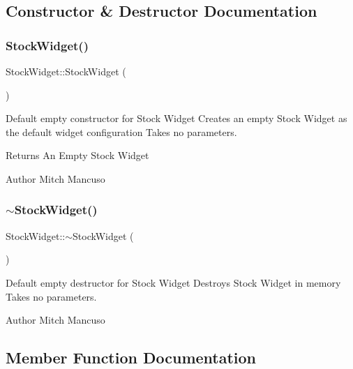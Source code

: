 \subsection{Constructor \& Destructor Documentation}
\mbox{\label{class_stock_widget_aa2748d2e00f0e4b91e1aea0faccba2f1}} 
\subsubsection{\texorpdfstring{Stock\+Widget()}{StockWidget()}}
{\footnotesize\ttfamily Stock\+Widget\+::\+Stock\+Widget (\begin{DoxyParamCaption}{ }\end{DoxyParamCaption})}



Default empty constructor for Stock Widget  Creates an empty Stock Widget as the default widget configuration  Takes no parameters. 

\begin{DoxyReturn}{Returns}
An Empty Stock Widget 
\end{DoxyReturn}
\begin{DoxyAuthor}{Author}
Mitch Mancuso 
\end{DoxyAuthor}
\mbox{\label{class_stock_widget_a439ffbe3e2ebbd7e0760ee10156448b5}} 
\subsubsection{\texorpdfstring{$\sim$\+Stock\+Widget()}{~StockWidget()}}
{\footnotesize\ttfamily Stock\+Widget\+::$\sim$\+Stock\+Widget (\begin{DoxyParamCaption}{ }\end{DoxyParamCaption})}



Default empty destructor for Stock Widget  Destroys Stock Widget in memory  Takes no parameters. 

\begin{DoxyAuthor}{Author}
Mitch Mancuso 
\end{DoxyAuthor}


\subsection{Member Function Documentation}
\mbox{\label{class_stock_widget_ad053fb0af2da4413c337771fa083bc07}} 
